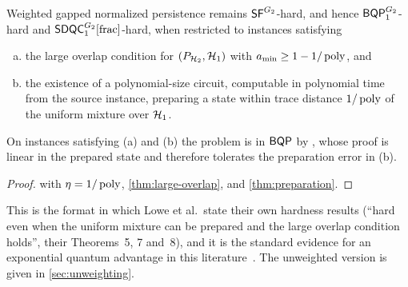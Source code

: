 \begin{theorem}
\label{thm:advantage}
Weighted gapped normalized persistence remains \(\mathsf{SF}^{G_2}\)-hard, and hence
\(\mathsf{BQP}_{1}^{G_2}\)-hard and \(\mathsf{SDQC}_{1}^{G_2}[\mathrm{frac}]\)-hard, when
restricted to instances satisfying
\begin{enumerate}[(a)]
\item the large overlap condition for \((P_{\mathcal{H}_2},\mathcal{H}_1)\) with
\(a_{\min}\ge1-1/\operatorname{poly}\), and
\item the existence of a polynomial-size circuit, computable in polynomial
time from the source instance, preparing a state within trace distance
\(1/\operatorname{poly}\) of the uniform mixture over \(\mathcal{H}_1\).
\end{enumerate}
On instances satisfying (a) and (b) the problem is in \(\mathsf{BQP}\)
by \cite[Lemma~7]{lowe2026normalized}, whose proof is linear in the prepared
state and therefore tolerates the preparation error in (b).
\end{theorem}

\begin{proof}
 with \(\eta=1/\operatorname{poly}\), \cref{thm:large-overlap},
and \cref{thm:preparation}.
\end{proof}

This is the format in which Lowe et al.\ state their own hardness results
(``hard even when the uniform mixture can be prepared and the large
overlap condition holds'', their Theorems~5, 7 and~8), and it is the standard
evidence for an exponential quantum advantage in this
literature~\cite{gyurik2022towards,gyurik2026provable}.  The unweighted
version is given in \cref{sec:unweighting}.

